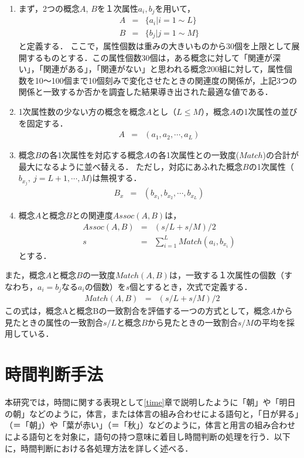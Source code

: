 \begin{enumerate}
\item まず，2つの概念$A$, $B$を１次属性$a_i, b_j$を用いて，
\begin{eqnarray}
A &=& \{ a_i | i=1\sim L \} \label{ConA} \nonumber \\
B &=& \{ b_j | j=1\sim M \}	\label{ConB} \nonumber
\end{eqnarray}
と定義する．
ここで，属性個数は重みの大きいものから30個を上限として展開するものとする．この属性個数30個は，ある概念に対して「関連が深い」，「関連がある」，「関連がない」と思われる概念200組に対して，属性個数を10〜100個まで10個刻みで変化させたときの関連度の関係が，上記3つの関係と一致するか否かを調査した結果導き出された最適な値である．\cite{irie:99}

\item 1次属性数の少ない方の概念を概念$A$とし（$L \le M$），概念$A$の1次属性の並びを固定する．
	\begin{eqnarray}
	A &=& (a_1, a_2, \cdots, a_L) \nonumber
	\end{eqnarray}
\item 概念$B$の各1次属性を対応する概念$A$の各1次属性との一致度($Match$)の合計が最大になるように並べ替える．
ただし，対応にあふれた概念$B$の1次属性（$b_{x_j}, \ j=L+1, \cdots, M$)は無視する．
	\begin{eqnarray}
	B_x &=& (b_{x_1}, b_{x_2}, \cdots, b_{x_L}) \nonumber
	\end{eqnarray}
\item 概念$A$と概念$B$との関連度$Assoc(A,B)$は，
	\begin{eqnarray}
	Assoc(A,B) &=& (s/L+s/M)/2  \label{Echain} \nonumber \\
	s &=& \sum_{i=1}^L Match(a_i, b_{x_i}) \nonumber
	\end{eqnarray}
とする．
\end{enumerate}

また，概念$A$と概念$B$の一致度$Match(A,B)$は，一致する１次属性の個数（すなわち，$a_i = b_j$なる$a_i$の個数）を$s$個とするとき，次式で定義する．
\begin{eqnarray}
Match(A,B) &=& (s/L + s/M)/2	\label{Ematch} \nonumber
\end{eqnarray}
この式は，概念Aと概念Bの一致割合を評価する一つの方式として，概念$A$から見たときの属性の一致割合$s/L$と概念$B$から見たときの一致割合$s/M$の平均を採用している．


\section{時間判断手法}
本研究では，時間に関する表現として\ref{time}章で説明したように「朝」や「明日の朝」などのように，体言，または体言の組み合わせによる語句と，「日が昇る」（＝「朝」）や「葉が赤い」（＝「秋」）などのように，体言と用言の組み合わせによる語句とを対象に，語句の持つ意味に着目し時間判断の処理を行う．以下に，時間判断における各処理方法を詳しく述べる．


